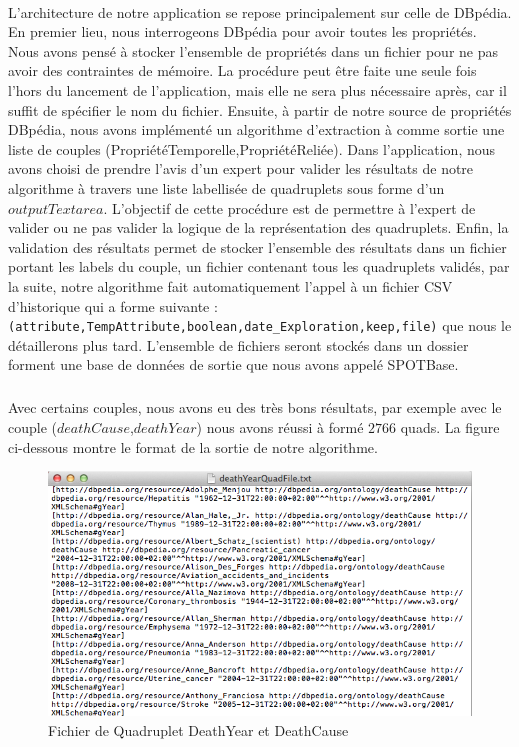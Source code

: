 \documentclass[12pt,a4	]{report}
\begin{document}
\paragraph{}
L'architecture de notre application se repose principalement sur celle de DBpédia. En premier lieu, nous interrogeons DBpédia pour avoir toutes les propriétés. Nous avons pensé à stocker l'ensemble de propriétés dans un fichier pour ne pas avoir des contraintes de mémoire. La procédure peut être faite une seule fois l'hors du lancement de l'application, mais elle ne sera plus nécessaire après, car il suffit de spécifier le nom du fichier. Ensuite, à partir de notre source de propriétés DBpédia, nous avons implémenté un algorithme d'extraction à comme sortie une liste de couples (PropriétéTemporelle,PropriétéReliée). Dans l'application, nous avons choisi de prendre l'avis d'un expert pour valider les résultats de notre algorithme à travers une liste labellisée de quadruplets sous forme d'un $output Textarea$. L'objectif de cette procédure est de permettre à l'expert de valider ou ne pas valider la logique de la représentation des quadruplets. Enfin, la validation des résultats permet de stocker l'ensemble des résultats dans un fichier portant les labels du couple, un fichier contenant tous les quadruplets validés, par la suite, notre algorithme fait automatiquement l'appel à un fichier CSV d'historique qui a forme suivante :
\newline
{\tt (attribute,TempAttribute,boolean,date\_Exploration,keep,file)} que nous le détaillerons plus tard. L'ensemble de fichiers seront stockés dans un dossier forment une base de données de sortie que nous avons appelé SPOTBase.
\subparagraph{}
Avec certains couples, nous avons eu des très bons résultats, par exemple avec le couple ($deathCause$,$deathYear$) nous avons réussi à formé $2766$ quads. La figure ci-dessous montre le format de la sortie de notre algorithme.
 \begin{figure}[H]
        \centering
                \includegraphics[width=13cm]{DeathYearCause.png}
               \caption{Fichier de Quadruplet DeathYear et DeathCause}
\end{figure}
\end{document}
